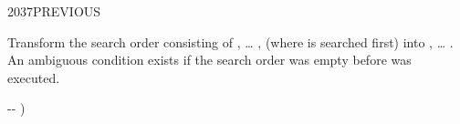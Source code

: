 \begin{worddef}{2037}{PREVIOUS}
\item \stack{}{}

	Transform the search order consisting of , {\ldots}
	,  (where  is searched
	first) into , {\ldots} . An ambiguous
	condition exists if the search order was empty before
	 was executed.

	\begin{implement} %
		\word{:}   -{}- )
			    
		\word{;}
	\end{implement}
\end{worddef}
